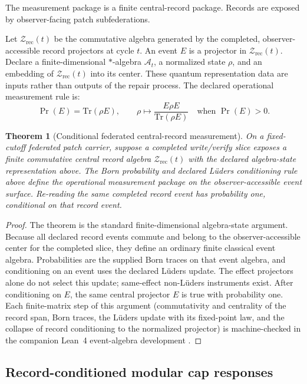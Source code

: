 \documentclass[11pt]{article}
\newtheorem{theorem}{Theorem}[section]
\theoremstyle{remark}
\theoremstyle{plain}
\begin{document}
The measurement package is a finite central-record package. Records are exposed by
observer-facing patch subfederations.

Let \(\mathcal Z_{\mathrm{rec}}(t)\) be the commutative algebra generated by the completed,
observer-accessible record projectors at cycle \(t\). An event \(E\) is a projector in
\(\mathcal Z_{\mathrm{rec}}(t)\). Declare a finite-dimensional
\(*\)-algebra \(\mathcal A_t\), a normalized state \(\rho\), and an embedding
of \(\mathcal Z_{\mathrm{rec}}(t)\) into its center. These quantum
representation data are inputs rather than outputs of the repair process.
The declared operational measurement rule is:
\[
\Pr(E)=\mathrm{Tr}(\rho E),
\qquad
\rho\mapsto \frac{E\rho E}{\mathrm{Tr}(\rho E)}
\quad\text{when }\Pr(E)>0.
\]

\begin{theorem}[Conditional federated central-record measurement]
On a fixed-cutoff federated patch carrier, suppose a completed write/verify slice exposes a finite
commutative central record algebra \(\mathcal Z_{\mathrm{rec}}(t)\) with the
declared algebra-state representation above. The Born probability and
declared L\"uders conditioning rule above define the operational measurement package on the
observer-accessible event surface. Re-reading the same completed record event has probability
one, conditional on that record event.
\end{theorem}

\begin{proof}
The theorem is the standard finite-dimensional algebra-state argument. Because all declared
record events commute and belong to the observer-accessible center for the completed slice, they
define an ordinary finite classical event algebra. Probabilities are the supplied Born traces on that event
algebra, and conditioning on an event uses the declared L\"uders update. The
effect projectors alone do not select this update; same-effect non-L\"uders
instruments exist. After conditioning on \(E\), the
same central projector \(E\) is true with probability one. Each finite-matrix step of this
argument (commutativity and centrality of the record span, Born traces, the L\"uders update with
its fixed-point law, and the collapse of record conditioning to the normalized projector) is
machine-checked in the companion Lean~4 event-algebra development \cite{eventalgebraLean}.
\end{proof}

\subsection{Record-conditioned modular cap responses}\label{subsec:record-conditioned-modular-cap-responses}
\end{document}
